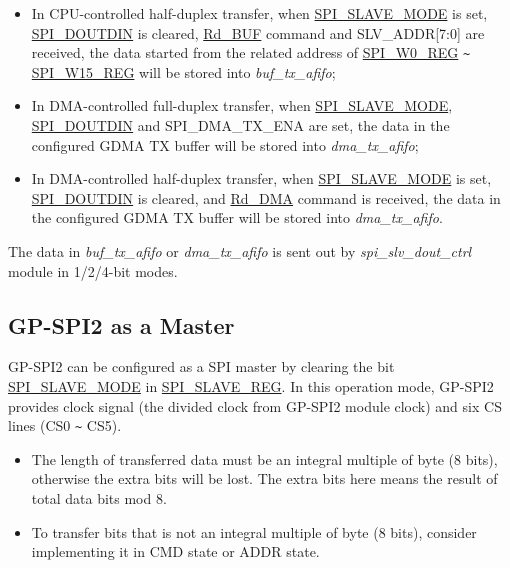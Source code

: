 \documentclass[main\_\_EN.tex]{subfiles}
\begin{document}
\begin{itemize}
\begin{itemize}
        \item In CPU-controlled half-duplex transfer, when \hyperref[fielddesc:SPISLAVEMODE]{SPI\_SLAVE\_MODE} is set, \hyperref[fielddesc:SPIDOUTDIN]{SPI\_DOUTDIN} is cleared, \hyperref[cmd:rdbuf]{Rd\_BUF} command and SLV\_ADDR[7:0] are received, the data started from the related address of \hyperref[regdesc:SPIW0REG]{SPI\_W0\_REG} \verb+~+ \hyperref[regdesc:SPIW0REG]{SPI\_W15\_REG} will be stored into \emph{buf\_tx\_afifo};        
       
        \item In DMA-controlled full-duplex transfer, when \hyperref[fielddesc:SPISLAVEMODE]{SPI\_SLAVE\_MODE}, \hyperref[fielddesc:SPIDOUTDIN]{SPI\_DOUTDIN} and SPI\_DMA\_TX\_ENA are set, the data in the configured GDMA TX buffer will be stored into \emph{dma\_tx\_afifo};       
        
        \item In DMA-controlled half-duplex transfer, when \hyperref[fielddesc:SPISLAVEMODE]{SPI\_SLAVE\_MODE} is set, \hyperref[fielddesc:SPIDOUTDIN]{SPI\_DOUTDIN} is cleared, and \hyperref[cmd:rddma]{Rd\_DMA} command is received, the data in the configured GDMA TX buffer will be stored into \emph{dma\_tx\_afifo}.
        
    \end{itemize}
    
The data in \emph{buf\_tx\_afifo} or \emph{dma\_tx\_afifo} is sent out by \emph{spi\_slv\_dout\_ctrl} module in 1/2/4-bit modes.
\end{itemize}

\subsection{GP-SPI2 as a Master}\label{sec:gp-spi2-master}

GP-SPI2 can be configured as a SPI master by clearing the bit \hyperref[fielddesc:SPISLAVEMODE]{SPI\_SLAVE\_MODE} in \hyperref[regdesc:SPISLAVEREG]{SPI\_SLAVE\_REG}. In this operation mode, GP-SPI2 provides clock signal (the divided clock from GP-SPI2 module clock) and six CS lines (CS0 \verb+~+ CS5).

\begin{tiplisting}
\vspace{-2em}
\begin{itemize}
    \item The length of transferred data must be an integral multiple of byte (8 bits), otherwise the extra bits will be lost. The extra bits here means the result of total data bits mod 8. 
    \item To transfer bits that is not an integral multiple of byte (8 bits), consider implementing it in CMD state or ADDR state.
\end{itemize}
\end{tiplisting}
 
\end{document}
